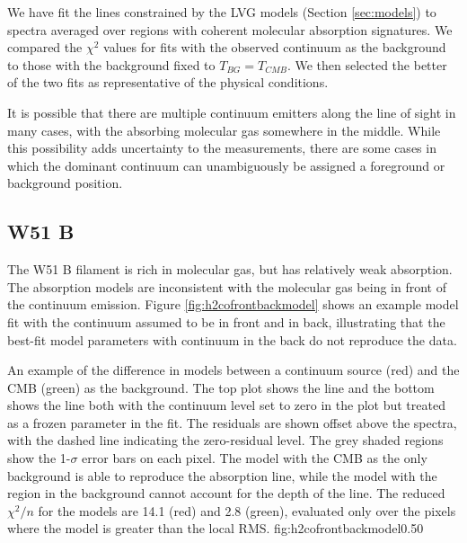 We have fit the \formaldehyde lines constrained by the LVG models (Section
\ref{sec:models}) to spectra averaged over regions with coherent molecular
absorption signatures.  We compared the $\chi^2$ values for fits with the
observed continuum as the background to those with the background fixed to
$T_{BG} = T_{CMB}$.  We then selected the better of the two fits as
representative of the physical conditions.

It is possible that there are multiple continuum emitters along the line of
sight in many cases, with the absorbing molecular gas somewhere in the middle.
While this possibility adds uncertainty to the measurements, there are some
cases in which the dominant continuum can unambiguously be assigned a
foreground or background position.

\subsection{W51 B}
The W51 B filament is rich in molecular gas, but has relatively weak
\formaldehyde absorption.  The absorption models are inconsistent with
the molecular gas being in front of the continuum emission.
Figure \ref{fig:h2cofrontbackmodel} shows an example model fit with the
continuum assumed to be in front and in back, illustrating that the best-fit
model parameters with continuum in the back do not reproduce the data.

{An example of the difference in models between a continuum source (red) and
the CMB (green) as the background.  The top plot shows the \oneone line and the
bottom shows the \twotwo line both with the continuum level set to zero in the
plot but treated as a frozen parameter in the fit.  The residuals are shown
offset above the spectra, with the dashed line indicating the zero-residual
level.  The grey shaded regions show the 1-$\sigma$ error bars on each pixel.
The model with the CMB as the only
background is able to reproduce the absorption line, while the model with the
\hii region in the background cannot account for the depth of the \twotwo line.
The reduced $\chi^2/n$ for the models are 14.1 (red) and 2.8 (green), evaluated
only over the pixels where the model is greater than the local RMS.}
{fig:h2cofrontbackmodel}{0.5}{0}


